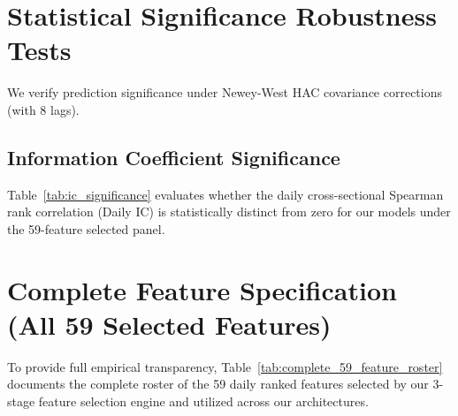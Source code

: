 \documentclass[11pt]{article}
\begin{document}
\section{Statistical Significance Robustness Tests}
We verify prediction significance under Newey-West HAC covariance corrections (with 8 lags).

\subsection{Information Coefficient Significance}
Table~\ref{tab:ic_significance} evaluates whether the daily cross-sectional Spearman rank correlation (Daily IC) is statistically distinct from zero for our models under the 59-feature selected panel.

\begin{table}[H]
    \centering
    \caption{Information Coefficient (IC) Statistical Significance (21-Day Horizon, 59 Features)}
    \label{tab:ic_significance}
\end{table}

\section{Complete Feature Specification (All 59 Selected Features)}
To provide full empirical transparency, Table~\ref{tab:complete_59_feature_roster} documents the complete roster of the 59 daily ranked features selected by our 3-stage feature selection engine and utilized across our architectures.
\end{document}
